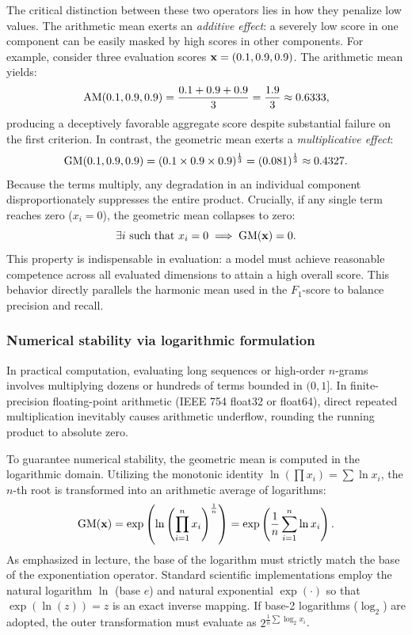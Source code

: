 \documentclass[../../main.tex]{subfiles}
\begin{document}
The critical distinction between these two operators lies in how they penalize low values. The arithmetic mean exerts an \textit{additive effect}: a severely low score in one component can be easily masked by high scores in other components. For example, consider three evaluation scores $\mathbf{x} = (0.1, 0.9, 0.9)$. The arithmetic mean yields:
\begin{equation}
\mathrm{AM}(0.1, 0.9, 0.9) = \frac{0.1 + 0.9 + 0.9}{3} = \frac{1.9}{3} \approx 0.6333,
\end{equation}
producing a deceptively favorable aggregate score despite substantial failure on the first criterion. In contrast, the geometric mean exerts a \textit{multiplicative effect}:
\begin{equation}
\mathrm{GM}(0.1, 0.9, 0.9) = (0.1 \times 0.9 \times 0.9)^{\frac{1}{3}} = (0.081)^{\frac{1}{3}} \approx 0.4327.
\end{equation}
Because the terms multiply, any degradation in an individual component disproportionately suppresses the entire product. Crucially, if any single term reaches zero ($x_i = 0$), the geometric mean collapses to zero:
\begin{equation}
\label{eq:geometric_mean_zero_collapse}
\exists i \text{ such that } x_i = 0 \implies \mathrm{GM}(\mathbf{x}) = 0.
\end{equation}
This property is indispensable in evaluation: a model must achieve reasonable competence across all evaluated dimensions to attain a high overall score. This behavior directly parallels the harmonic mean used in the $F_1$-score to balance precision and recall.

\subsubsection{Numerical stability via logarithmic formulation}
In practical computation, evaluating long sequences or high-order $n$-grams involves multiplying dozens or hundreds of terms bounded in $(0, 1]$. In finite-precision floating-point arithmetic (IEEE 754 float32 or float64), direct repeated multiplication inevitably causes arithmetic underflow, rounding the running product to absolute zero.

To guarantee numerical stability, the geometric mean is computed in the logarithmic domain. Utilizing the monotonic identity $\ln\left(\prod x_i\right) = \sum \ln x_i$, the $n$-th root is transformed into an arithmetic average of logarithms:
\begin{equation}
\label{eq:geometric_mean_log_trick}
\mathrm{GM}(\mathbf{x}) = \exp\left( \ln\left( \prod_{i=1}^n x_i \right)^{\frac{1}{n}} \right) = \exp\left( \frac{1}{n} \sum_{i=1}^n \ln x_i \right).
\end{equation}
As emphasized in lecture, the base of the logarithm must strictly match the base of the exponentiation operator. Standard scientific implementations employ the natural logarithm $\ln$ (base $e$) and natural exponential $\exp(\cdot)$ so that $\exp(\ln(z)) = z$ is an exact inverse mapping. If base-2 logarithms ($\log_2$) are adopted, the outer transformation must evaluate as $2^{\frac{1}{n} \sum \log_2 x_i}$.
\end{document}

